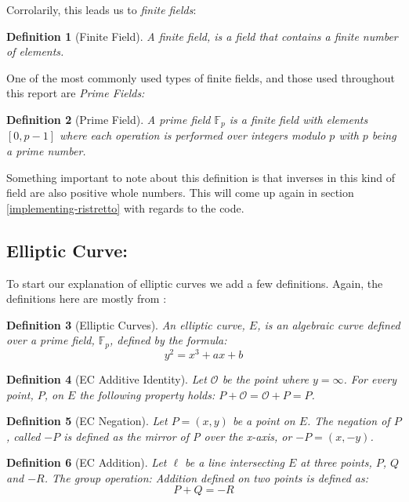 \documentclass{article}
\newtheorem{definition}{Definition}[section]
\renewcommand{\O}{\mathcal{O}}
\newcommand{\F}{\mathbb{F}}
\begin{document}
Corrolarily, this leads us to \textit{finite fields}:

\begin{definition}[Finite Field]
	A finite field, is a field that contains a finite number of elements.
\end{definition}

One of the most commonly used types of finite fields, and those used
throughout this report are \textit{Prime Fields:} 

\begin{definition}[Prime Field]
	A prime field $\F_p$ is a finite field with elements $[0,p-1]$
	where each operation is performed over integers modulo $p$
	with $p$ being a prime number.
\end{definition}

Something important to note about this definition is that inverses in
this kind of field are also positive whole numbers. This will come up
again in section \ref{implementing-ristretto} with regards to the code.

\subsection{Elliptic Curve:}\label{elliptic-curves}

To start our explanation of elliptic curves we add a few
definitions. Again, the definitions here are mostly from
\cite{elliptic-curves}:

\begin{definition}[Elliptic Curves]
	An elliptic curve, $E$, is an algebraic curve defined over a
	prime field, $\F_p$, defined by the formula:
	$$y^2 = x^3 + ax + b$$
\end{definition}

\begin{definition}[EC Additive Identity]
	Let $\O$ be the point where $y = \infty$. For every point, $P$,
	on $E$ the following property holds:
	$P + \O = \O + P = P$.
\end{definition}

\begin{definition}[EC Negation]
	Let $P = (x,y)$ be a point on $E$. The negation of $P$, called $-P$
	is defined as the mirror of P over the x-axis, or $-P = (x,-y)$.
\end{definition}

\begin{definition}[EC Addition]
	Let $\ell$ be a line intersecting $E$ at three points, $P$, $Q$ and
	$-R$. The group operation: Addition defined on two points is defined
	as:
	$$P + Q = {-R}$$
\end{definition}
\end{document}
